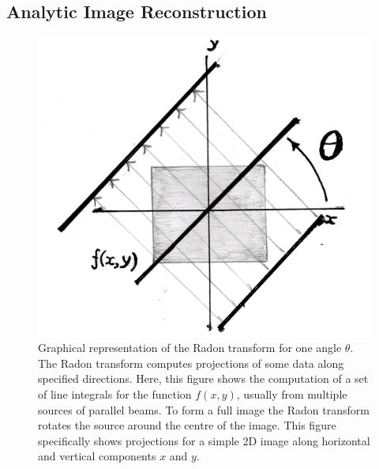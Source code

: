         \subsection{Analytic Image Reconstruction} \label{sec:analytic_image_reconstruction}
            \begin{figure}
                \centering
                    
                \includegraphics[width=1.0\linewidth]{figures/background_radon_transform.png}
                    
                \captionsetup{singlelinecheck=false, justification=raggedright}
                \caption{Graphical representation of the Radon transform for one angle $\theta$. The Radon transform computes projections of some data along specified directions. Here, this figure shows the computation of a set of line integrals for the function $f(x, y)$, usually from multiple sources of parallel beams. To form a full image the Radon transform rotates the source around the centre of the image. This figure specifically shows projections for a simple \gls{2D} image along horizontal and vertical components $x$ and $y$.} \label{fig:analytic_image_reconstruction_radon_transform}
            \end{figure}
            

